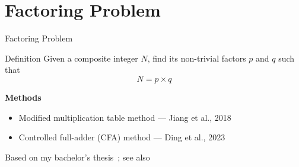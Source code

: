 \documentclass[18pt,aspectratio=169]{beamer}
\begin{document}
\section{Factoring Problem}

\begin{frame}{Factoring Problem}
\begin{block}{Definition}
Given a composite integer $N$, find its non-trivial factors $p$ and $q$ such that
\begin{equation*}
N = p \times q
\end{equation*}
\end{block}

\vspace{1em}
\textbf{Methods}
\begin{itemize}
    \item Modified multiplication table method --- Jiang et al., 2018~\cite{Jiang_2018}
    \item Controlled full-adder (CFA) method --- Ding et al., 2023~\cite{Ding_2023}
\end{itemize}

\vfill
\footnotesize Based on my bachelor's thesis~\cite{Hanussek_2024_BSc}; see also~\cite{willsch2024state}
\end{frame}
\end{document}
